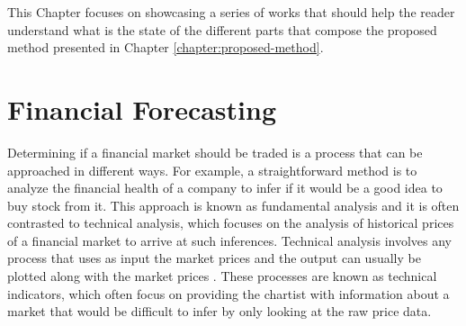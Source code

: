 




This Chapter focuses on showcasing a series of works that should help the reader
understand what is the state of the different parts that compose the proposed
method presented in Chapter \ref{chapter:proposed-method}.

\section{Financial Forecasting}
\label{section:financial-forecasting}

Determining if a financial market should be traded is a process that can be
approached in different ways. For example, a straightforward method is to
analyze the financial health of a company to infer if it would be a good idea to
buy stock from it. This approach is known as fundamental analysis
\cite{Martinez-Jaramillo2009} and it is often contrasted to technical analysis,
which focuses on the analysis of historical prices of a financial market to
arrive at such inferences. Technical analysis involves any process that uses as
input the market prices and the output can usually be plotted along with the
market prices \cite{Achelis2000}. These processes are known as technical
indicators, which often focus on providing the chartist with information about a
market that would be difficult to infer by only looking at the raw price data.

